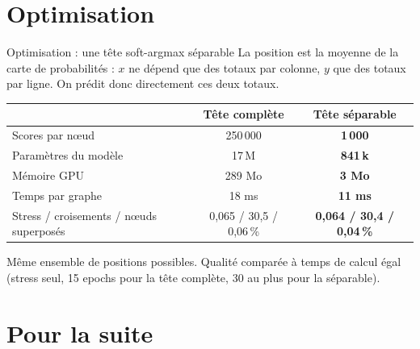\documentclass[aspectratio=169,11pt]{beamer}
\begin{document}
\section{Optimisation}

\begin{frame}{Optimisation : une tête soft-argmax séparable}
\small La position est la moyenne de la carte de probabilités : $x$ ne dépend que des totaux par colonne, $y$ que des totaux par ligne. On prédit donc directement ces deux totaux.

\vspace{0.3cm}
\centering
\footnotesize
\begin{tabular}{@{}lcc@{}}
\toprule
 & \textbf{Tête complète} & \textbf{Tête séparable} \\
\midrule
Scores par nœud & 250\,000 & \textbf{1\,000} \\
Paramètres du modèle & 17\,M & \textbf{841\,k} \\
Mémoire GPU & 289 Mo & \textbf{3 Mo} \\
Temps par graphe & 18 ms & \textbf{11 ms} \\
Stress / croisements / nœuds superposés & 0,065 / 30,5 / 0,06\,\% & \textbf{0,064 / 30,4 / 0,04\,\%} \\
\bottomrule
\end{tabular}

\vspace{0.3cm}
\scriptsize\textcolor{gris}{Même ensemble de positions possibles. Qualité comparée à temps de calcul égal (stress seul, 15 epochs pour la tête complète, 30 au plus pour la séparable).}
\end{frame}

\section{Pour la suite}
\end{document}

